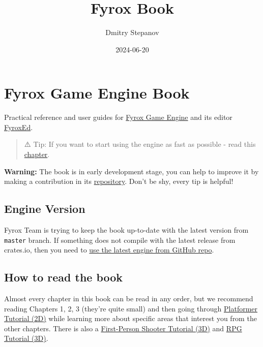 \documentclass[
]{book}
\title{Fyrox Book}
\author{Dmitry Stepanov}
\date{2024-06-20}
\theoremstyle{definition}
\theoremstyle{definition}
\theoremstyle{definition}
\theoremstyle{definition}
\theoremstyle{remark}
\begin{document}
\maketitle

{
\setcounter{tocdepth}{1}
\tableofcontents
}
\chapter{Fyrox Game Engine Book}\label{fyrox-game-engine-book}

Practical reference and user guides for \href{https://github.com/FyroxEngine/Fyrox}{Fyrox Game Engine} and its editor \href{https://github.com/FyroxEngine/Fyrox/tree/master/editor}{FyroxEd}.

\begin{quote}
⚠️ Tip: If you want to start using the engine as fast as possible - read this \href{./beginning/scripting.md}{chapter}.
\end{quote}

\textbf{Warning:} The book is in early development stage, you can help to improve it by making a contribution in its \href{https://github.com/fyrox-book/fyrox-book.github.io}{repository}. Don't be shy, every tip is helpful!

\section{Engine Version}\label{engine-version}

Fyrox Team is trying to keep the book up-to-date with the latest version from \texttt{master} branch. If something does not compile with the latest release from crates.io, then you need to \href{./beginning/scripting.md\#using-the-latest-engine-version}{use the latest engine from GitHub repo}.

\section{How to read the book}\label{how-to-read-the-book}

Almost every chapter in this book can be read in any order, but we recommend reading Chapters 1, 2, 3 (they're quite small) and then going through \href{./tutorials/platformer/part1.md}{Platformer Tutorial (2D)} while learning more about specific areas that interest you from the other chapters. There is also a \href{tutorials/fps/tutorial-1/fps-tutorial.md}{First-Person Shooter Tutorial (3D)} and \href{./tutorials/rpg/intro.md}{RPG Tutorial (3D)}.
\end{document}
